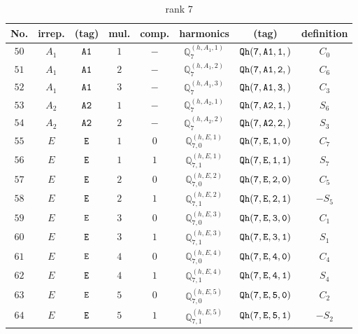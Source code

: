 \documentclass[fleqn,8pt]{jsarticle}
\begin{document}
\begin{table}[ht!]
\begin{center}
\caption{rank 7}
\renewcommand{\arraystretch}{1.3}
\begin{tabular}{cccccccc} \hline \hline
No. & irrep. & (tag) & mul. & comp. & harmonics & (tag) & definition \\ \hline
$ 50 $ & $ A_{1} $ & $ {\tt A1} $ & $ 1 $ & $ - $ & $ \mathbb{Q}_{7}^{(h,A_{1},1)} $ & $ {\tt Qh(7,A1,1,)} $ & $ C_{0} $ \\
$ 51 $ & $ A_{1} $ & $ {\tt A1} $ & $ 2 $ & $ - $ & $ \mathbb{Q}_{7}^{(h,A_{1},2)} $ & $ {\tt Qh(7,A1,2,)} $ & $ C_{6} $ \\
$ 52 $ & $ A_{1} $ & $ {\tt A1} $ & $ 3 $ & $ - $ & $ \mathbb{Q}_{7}^{(h,A_{1},3)} $ & $ {\tt Qh(7,A1,3,)} $ & $ C_{3} $ \\
$ 53 $ & $ A_{2} $ & $ {\tt A2} $ & $ 1 $ & $ - $ & $ \mathbb{Q}_{7}^{(h,A_{2},1)} $ & $ {\tt Qh(7,A2,1,)} $ & $ S_{6} $ \\
$ 54 $ & $ A_{2} $ & $ {\tt A2} $ & $ 2 $ & $ - $ & $ \mathbb{Q}_{7}^{(h,A_{2},2)} $ & $ {\tt Qh(7,A2,2,)} $ & $ S_{3} $ \\
$ 55 $ & $ E $ & $ {\tt E} $ & $ 1 $ & $ 0 $ & $ \mathbb{Q}_{7,0}^{(h,E,1)} $ & $ {\tt Qh(7,E,1,0)} $ & $ C_{7} $ \\
$ 56 $ & $ E $ & $ {\tt E} $ & $ 1 $ & $ 1 $ & $ \mathbb{Q}_{7,1}^{(h,E,1)} $ & $ {\tt Qh(7,E,1,1)} $ & $ S_{7} $ \\
$ 57 $ & $ E $ & $ {\tt E} $ & $ 2 $ & $ 0 $ & $ \mathbb{Q}_{7,0}^{(h,E,2)} $ & $ {\tt Qh(7,E,2,0)} $ & $ C_{5} $ \\
$ 58 $ & $ E $ & $ {\tt E} $ & $ 2 $ & $ 1 $ & $ \mathbb{Q}_{7,1}^{(h,E,2)} $ & $ {\tt Qh(7,E,2,1)} $ & $ - S_{5} $ \\
$ 59 $ & $ E $ & $ {\tt E} $ & $ 3 $ & $ 0 $ & $ \mathbb{Q}_{7,0}^{(h,E,3)} $ & $ {\tt Qh(7,E,3,0)} $ & $ C_{1} $ \\
$ 60 $ & $ E $ & $ {\tt E} $ & $ 3 $ & $ 1 $ & $ \mathbb{Q}_{7,1}^{(h,E,3)} $ & $ {\tt Qh(7,E,3,1)} $ & $ S_{1} $ \\
$ 61 $ & $ E $ & $ {\tt E} $ & $ 4 $ & $ 0 $ & $ \mathbb{Q}_{7,0}^{(h,E,4)} $ & $ {\tt Qh(7,E,4,0)} $ & $ C_{4} $ \\
$ 62 $ & $ E $ & $ {\tt E} $ & $ 4 $ & $ 1 $ & $ \mathbb{Q}_{7,1}^{(h,E,4)} $ & $ {\tt Qh(7,E,4,1)} $ & $ S_{4} $ \\
$ 63 $ & $ E $ & $ {\tt E} $ & $ 5 $ & $ 0 $ & $ \mathbb{Q}_{7,0}^{(h,E,5)} $ & $ {\tt Qh(7,E,5,0)} $ & $ C_{2} $ \\
$ 64 $ & $ E $ & $ {\tt E} $ & $ 5 $ & $ 1 $ & $ \mathbb{Q}_{7,1}^{(h,E,5)} $ & $ {\tt Qh(7,E,5,1)} $ & $ - S_{2} $ \\
 \hline \hline
\end{tabular}
\end{center}
\end{table}
\end{document}
